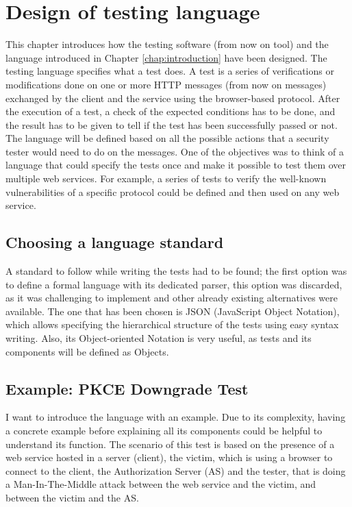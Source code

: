 \chapter{Design of testing language}
\label{chap:Design}
This chapter introduces how the testing software (from now on tool) and the language introduced in Chapter \ref{chap:introduction} have been designed. The testing language specifies what a test does. A test is a series of verifications or modifications done on one or more HTTP messages (from now on messages) exchanged by the client and the service using the browser-based protocol. After the execution of a test, a check of the expected conditions has to be done, and the result has to be given to tell if the test has been successfully passed or not. The language will be defined based on all the possible actions that a security tester would need to do on the messages. 
One of the objectives was to think of a language that could specify the tests once and make it possible to test them over multiple web services. For example, a series of tests to verify the well-known vulnerabilities of a specific protocol could be defined and then used on any web service.

\section{Choosing a language standard}
A standard to follow while writing the tests had to be found; the first option was to define a formal language with its dedicated parser, this option was discarded, as it was challenging to implement and other already existing alternatives were available. The one that has been chosen is JSON (JavaScript Object Notation), which allows specifying the hierarchical structure of the tests using easy syntax writing. Also, its Object-oriented Notation is very useful, as tests and its components will be defined as Objects.

\section{Example: PKCE Downgrade Test}
\label{sec:pkce_downgrade}

I want to introduce the language with an example. Due to its complexity, having a concrete example before explaining all its components could be helpful to understand its function.
The scenario of this test is based on the presence of a web service hosted in a server (client), the victim, which is using a browser to connect to the client, the Authorization Server (AS) and the tester, that is doing a Man-In-The-Middle attack between the web service and the victim, and between the victim and the AS.


